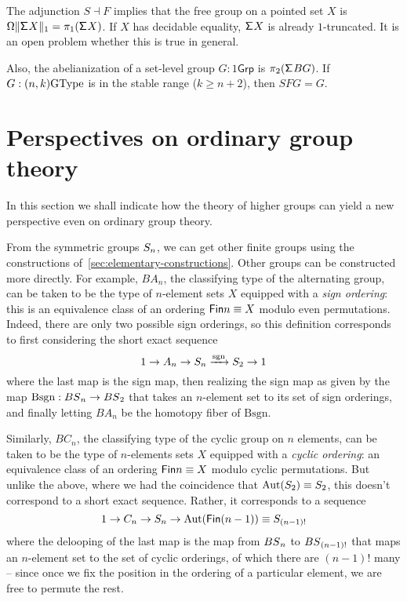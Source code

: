 The adjunction ${S} \dashv {F}$ implies that the free group on a
pointed set $X$ is $\Omega\trunc{1}{\susp X}=\pi_1(\susp X)$.  If $X$
has decidable equality, $\susp X$ is already $1$-truncated. It is an
open problem whether this is true in general.

Also, the abelianization of a set-level group $G : 1\mathsf{Grp}$ is
$\pi_2(\susp BG)$. If $G : (n,k)\GType$ is in the stable range ($k \ge
n+2$), then $SFG=G$.

\section{Perspectives on ordinary group theory}
\label{sec:perspectives}

In this section we shall indicate how the theory of higher groups can
yield a new perspective even on ordinary group theory.

From the symmetric groups $\Sym_n$, we can get other finite groups using
the constructions of~\autoref{sec:elementary-constructions}. Other
groups can be constructed more directly. For example,
$BA_n$, the classifying type of the alternating group, can be taken to
be the type of $n$-element sets $X$ equipped with a \emph{sign
  ordering}: this is an equivalence class of an ordering
$\Fin n \equiv X$ modulo even permutations. Indeed, there are only two
possible sign orderings, so this definition corresponds to
first considering the short exact sequence
\[
  1 \to A_n \to \Sym_n \xrightarrow{\mathrm{sgn}}{} \Sym_2 \to 1
\]
where the last map is the sign map, then realizing the sign map
as given by the map $\mathrm{Bsgn} : \BS_n \to \BS_2$ that takes
an $n$-element set to its set of sign orderings, and finally
letting $BA_n$ be the homotopy fiber of $\mathrm{Bsgn}$.

Similarly, $BC_n$, the classifying type of the cyclic group on $n$
elements, can be taken to be the type of $n$-elements sets $X$
equipped with a \emph{cyclic ordering}: an equivalence class of an
ordering $\Fin n \equiv X$ modulo cyclic permutations. But unlike
the above, where we had the coincidence that $\Aut(\Sym_2) \equiv
\Sym_2$,
this doesn't correspond to a short exact sequence. Rather,
it corresponds to a sequence
\[
  1 \to C_n \to \Sym_n \to \Aut(\Fin(n-1)) \equiv \Sym_{(n-1)!}
\]
where the delooping of the last map is the map from $\BS_n$ to
$\BS_{(n-1)!}$ that maps an $n$-element set to the set of cyclic
orderings, of which there are $(n-1)!$ many -- since once we fix the
position in the ordering of a particular element,
we are free to permute the rest.

